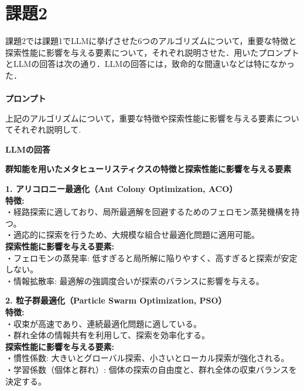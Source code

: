 \documentclass[a4paper]{ltjsarticle}
\begin{document}
\section{課題2}
課題2では課題1でLLMに挙げさせた6つのアルゴリズムについて，重要な特徴と探索性能に影響を与える要素について，それぞれ説明させた．用いたプロンプトとLLMの回答は次の通り．LLMの回答には，致命的な間違いなどは特になかった．\\\\\noindent
\textbf{プロンプト}
\begin{tcolorbox}[arc=4mm, enhanced, borderline={0.5mm}{0mm}{black}, breakable, colback = white]
上記のアルゴリズムについて，重要な特徴や探索性能に影響を与える要素についてそれぞれ説明して.
\end{tcolorbox}
\noindent\textbf{LLMの回答}
\begin{tcolorbox}[arc=6mm, enhanced, borderline={0.5mm}{0mm}{black}, breakable, colback = white]

    \textbf{群知能を用いたメタヒューリスティクスの特徴と探索性能に影響を与える要素}

    \vspace{10pt}
    
    \noindent \textbf{1. アリコロニー最適化（Ant Colony Optimization, ACO）}\\
    \textbf{特徴:} \\
    ・経路探索に適しており、局所最適解を回避するためのフェロモン蒸発機構を持つ。\\
    ・適応的に探索を行うため、大規模な組合せ最適化問題に適用可能。\\
    \textbf{探索性能に影響を与える要素:} \\
    ・フェロモンの蒸発率: 低すぎると局所解に陥りやすく、高すぎると探索が安定しない。\\
    ・情報拡散率: 最適解の強調度合いが探索のバランスに影響を与える。
    
    \vspace{10pt}
    
    \noindent \textbf{2. 粒子群最適化（Particle Swarm Optimization, PSO）}\\
    \textbf{特徴:} \\
    ・収束が高速であり、連続最適化問題に適している。\\
    ・群れ全体の情報共有を利用して、探索を効率化する。\\
    \textbf{探索性能に影響を与える要素:} \\
    ・慣性係数: 大きいとグローバル探索、小さいとローカル探索が強化される。\\
    ・学習係数（個体と群れ）: 個体の探索の自由度と、群れ全体の収束バランスを決定する。
    

\end{tcolorbox}
\end{document}
